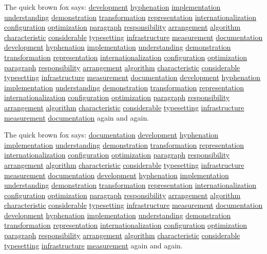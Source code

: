 \documentclass{article}
\begin{document}
The quick brown fox says: \underline{development} \underline{hyphenation} \underline{implementation} \underline{understanding} \underline{demonstration} \underline{transformation} \underline{representation} \underline{internationalization} \underline{configuration} \underline{optimization} \underline{paragraph} \underline{responsibility} \underline{arrangement} \underline{algorithm} \underline{characteristic} \underline{considerable} \underline{typesetting} \underline{infrastructure} \underline{measurement} \underline{documentation} \underline{development} \underline{hyphenation} \underline{implementation} \underline{understanding} \underline{demonstration} \underline{transformation} \underline{representation} \underline{internationalization} \underline{configuration} \underline{optimization} \underline{paragraph} \underline{responsibility} \underline{arrangement} \underline{algorithm} \underline{characteristic} \underline{considerable} \underline{typesetting} \underline{infrastructure} \underline{measurement} \underline{documentation} \underline{development} \underline{hyphenation} \underline{implementation} \underline{understanding} \underline{demonstration} \underline{transformation} \underline{representation} \underline{internationalization} \underline{configuration} \underline{optimization} \underline{paragraph} \underline{responsibility} \underline{arrangement} \underline{algorithm} \underline{characteristic} \underline{considerable} \underline{typesetting} \underline{infrastructure} \underline{measurement} \underline{documentation} again and again.

The quick brown fox says: \underline{documentation} \underline{development} \underline{hyphenation} \underline{implementation} \underline{understanding} \underline{demonstration} \underline{transformation} \underline{representation} \underline{internationalization} \underline{configuration} \underline{optimization} \underline{paragraph} \underline{responsibility} \underline{arrangement} \underline{algorithm} \underline{characteristic} \underline{considerable} \underline{typesetting} \underline{infrastructure} \underline{measurement} \underline{documentation} \underline{development} \underline{hyphenation} \underline{implementation} \underline{understanding} \underline{demonstration} \underline{transformation} \underline{representation} \underline{internationalization} \underline{configuration} \underline{optimization} \underline{paragraph} \underline{responsibility} \underline{arrangement} \underline{algorithm} \underline{characteristic} \underline{considerable} \underline{typesetting} \underline{infrastructure} \underline{measurement} \underline{documentation} \underline{development} \underline{hyphenation} \underline{implementation} \underline{understanding} \underline{demonstration} \underline{transformation} \underline{representation} \underline{internationalization} \underline{configuration} \underline{optimization} \underline{paragraph} \underline{responsibility} \underline{arrangement} \underline{algorithm} \underline{characteristic} \underline{considerable} \underline{typesetting} \underline{infrastructure} \underline{measurement} again and again.
\end{document}
